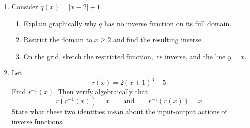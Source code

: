 \documentclass[12pt]{article}
\begin{document}
\begin{enumerate}[leftmargin=*,itemsep=1.15em]
  \item Consider $q(x)=|x-2|+1$.
  \begin{enumerate}[label=(\alph*),itemsep=0.3em]
    \item Explain graphically why $q$ has no inverse function on its full domain.
    \item Restrict the domain to $x\ge2$ and find the resulting inverse.
    \item On the grid, sketch the restricted function, its inverse, and the line $y=x$.
  \end{enumerate}

  \begin{center}
  \end{center}

  \item Let
  \[
    r(x)=2(x+1)^3-5.
  \]
  Find $r^{-1}(x)$. Then verify algebraically that
  \[
    r(r^{-1}(x))=x
    \qquad\text{and}\qquad
    r^{-1}(r(x))=x.
  \]
  State what these two identities mean about the input-output actions of inverse functions.
\end{enumerate}
\end{document}
